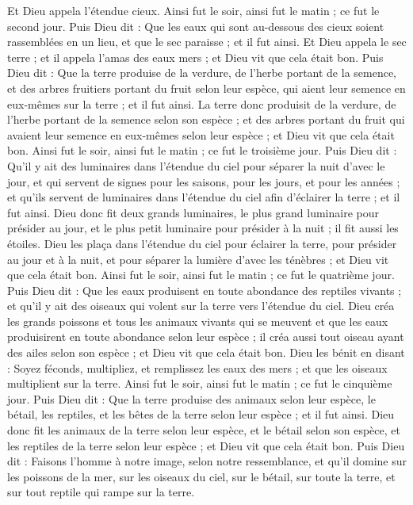 \begin{multicols}{2}
Et Dieu appela l'étendue cieux. Ainsi fut le soir, ainsi fut le matin ; ce fut le second jour.
Puis Dieu dit : Que les eaux qui sont au-dessous des cieux soient rassemblées en un lieu, et que le sec paraisse ; et il fut ainsi.
Et Dieu appela le sec terre ; et il appela l'amas des eaux mers ; et Dieu vit que cela était bon.
Puis Dieu dit : Que la terre produise de la verdure, de l'herbe portant de la semence, et des arbres fruitiers portant du fruit selon leur espèce, qui aient leur semence en eux-mêmes sur la terre ; et il fut ainsi.
La terre donc produisit de la verdure, de l'herbe portant de la semence selon son espèce ; et des arbres portant du fruit qui avaient leur semence en eux-mêmes selon leur espèce ; et Dieu vit que cela était bon.
Ainsi fut le soir, ainsi fut le matin ; ce fut le troisième jour.
Puis Dieu dit : Qu'il y ait des luminaires dans l'étendue du ciel pour séparer la nuit d'avec le jour, et qui servent de signes pour les saisons, pour les jours, et pour les années ;
et qu’ils servent de luminaires dans l'étendue du ciel afin d'éclairer la terre ; et il fut ainsi.
Dieu donc fit deux grands luminaires, le plus grand luminaire pour présider au jour, et le plus petit luminaire pour présider à la nuit ; il fit aussi les étoiles.
Dieu les plaça dans l'étendue du ciel pour éclairer la terre,
pour présider au jour et à la nuit, et pour séparer la lumière d’avec les ténèbres ; et Dieu vit que cela était bon.
Ainsi fut le soir, ainsi fut le matin ; ce fut le quatrième jour.
Puis Dieu dit : Que les eaux produisent en toute abondance des reptiles vivants ; et qu'il y ait des oiseaux qui volent sur la terre vers l'étendue du ciel.
Dieu créa les grands poissons et tous les animaux vivants qui se meuvent et que les eaux produisirent en toute abondance selon leur espèce ; il créa aussi tout oiseau ayant des ailes selon son espèce ; et Dieu vit que cela était bon.
Dieu les bénit en disant : Soyez féconds, multipliez, et remplissez les eaux des mers ; et que les oiseaux multiplient sur la terre.
Ainsi fut le soir, ainsi fut le matin ; ce fut le cinquième jour.
Puis Dieu dit : Que la terre produise des animaux selon leur espèce, le bétail, les reptiles, et les bêtes de la terre selon leur espèce ; et il fut ainsi.
Dieu donc fit les animaux de la terre selon leur espèce, et le bétail selon son espèce, et les reptiles de la terre selon leur espèce ; et Dieu vit que cela était bon.
Puis Dieu dit : Faisons l'homme à notre image, selon notre ressemblance, et qu'il domine sur les poissons de la mer, sur les oiseaux du ciel, sur le bétail, sur toute la terre, et sur tout reptile qui rampe sur la terre.

\end{multicols}
